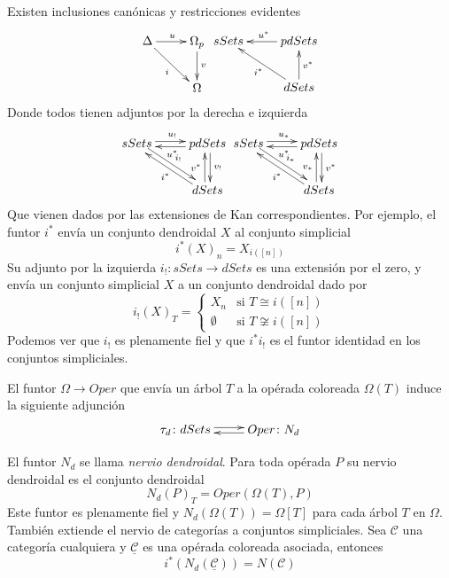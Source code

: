 \documentclass[11pt,a4paper,openright,oneside]{article}
\numberwithin{equation}{section}
\theoremstyle{definition}
\begin{document}
Existen inclusiones can\'onicas y restricciones evidentes
$$
    \xymatrix{
        \Delta \ar[rd]_{i} \ar[r]^u
        &\Omega_p \ar[d]^v\\
        &\Omega
    }
    \xymatrix{
    sSets
    &pdSets \ar[l]_{u^{*}} \\
    &dSets \ar[lu]^{i^{*}} \ar[u]_{v^{*}}
    }
$$
Donde todos tienen adjuntos por la derecha e izquierda
$$
    \xymatrix{
    sSets \ar@<0.5ex>[r]^{u_{!}} \ar@<0.5ex>[rd]^{i_{!}}
    &pdSets \ar@<0.5ex>[l]^{u^{*}} \ar@<0.5ex>[d]^{v_{!}} \\
    &dSets \ar@<0.5ex>[lu]^{i^{*}} \ar@<0.5ex>[u]^{v^{*}}
    }
    \xymatrix{
    sSets \ar@<0.5ex>[r]^{u_{*}} \ar@<0.5ex>[rd]^{i_{*}}
    &pdSets \ar@<0.5ex>[l]^{u^{*}} \ar@<0.5ex>[d]^{v^{*}} \\
    &dSets \ar@<0.5ex>[lu]^{i^{*}} \ar@<0.5ex>[u]^{v_{*}}
    }
$$
Que vienen dados por las extensiones de Kan correspondientes. Por ejemplo, el funtor $i^{*}$ env\'ia un conjunto dendroidal $X$ al conjunto simplicial
$$
    i^{*}(X)_n = X_{i([n])}
$$
Su adjunto por la izquierda $i_{!}\colon sSets \to dSets$ es una extensi\'on por el zero, y env\'ia un conjunto simplicial $X$ a un conjunto dendroidal dado por
\[
    i_{!}(X)_T =
    \begin{cases}
        X_n       & \text{si } T\cong i([n])     \\
        \emptyset & \text{si } T\not\cong i([n])
    \end{cases}
\]
Podemos ver que $i_!$ es plenamente fiel y que $i^{*}i_{!}$ es el funtor identidad en los conjuntos simpliciales.

El funtor $\Omega \to Oper$ que env\'ia un \'arbol $T$ a la op\'erada coloreada $\Omega(T)$ induce la siguiente adjunci\'on
\[
    \xymatrix{
        \tau_d\colon dSets\ar@<0.5ex>[r] &  Oper\colon N_d \ar@<0.5ex>[l]
    }
\]

El funtor $N_d$ se llama \emph{nervio dendroidal}. Para toda op\'erada $P$ su nervio dendroidal es el conjunto dendroidal
$$
    N_d(P)_T = Oper(\Omega(T), P)
$$
Este funtor es plenamente fiel y $N_d(\Omega(T))=\Omega[T]$ para cada \'arbol $T$ en $\Omega$.
Tambi\'en extiende el nervio de categor\'ias a conjuntos simpliciales. Sea $\mathcal{C}$ una categor\'ia cualquiera y $\underline{\mathcal{C}}$ es una op\'erada coloreada asociada, entonces
$$
    i^{*}(N_d(\underline{\mathcal{C}})) = N(\mathcal{C})
$$
\end{document}
